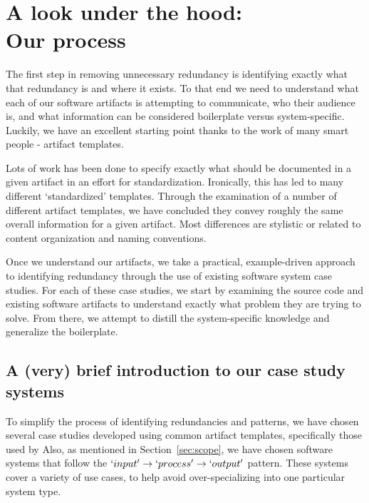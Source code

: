 \chapter{A look under the hood: \\ Our process}


The first step in removing unnecessary redundancy is identifying exactly what
that redundancy is and where it exists. To that end we need to understand what
each of our software artifacts is attempting to communicate, who their audience
is, and what information can be considered boilerplate versus system-specific.
Luckily, we have an excellent starting point thanks to the work of many smart
people - artifact templates.

Lots of work  has been done to specify 
exactly what should be documented in a given artifact in an effort for 
standardization. Ironically, this has led to many different `standardized' 
templates. Through the examination of a number of different artifact templates, 
we have concluded they convey roughly the same overall information for a given 
artifact. Most differences are stylistic or related to content 
organization and naming conventions.

Once we understand our artifacts, we take a practical, example-driven approach
to identifying redundancy through the use of existing software system case
studies. For each of these case studies, we start by examining the source code
and existing software artifacts to understand exactly what problem they are
trying to solve. From there, we attempt to distill the system-specific knowledge
and generalize the boilerplate.

\section{A (very) brief introduction to our case study systems}

To simplify the process of identifying redundancies and patterns, we have chosen
several case studies developed using common artifact templates, specifically 
those used by \smithea{}  Also, as mentioned in 
Section~\ref{sec:scope}, we have chosen software systems that follow the 
$`input' \rightarrow `process' \rightarrow `output'$ pattern. These systems 
cover a variety of use cases, to help avoid over-specializing into one 
particular system type. 

